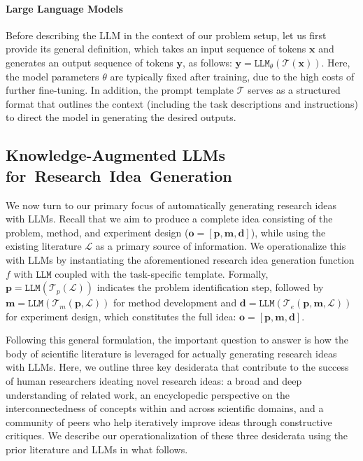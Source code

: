 \documentclass[11pt]{article}
\def\vd{{\bm{d}}}
\def\vm{{\bm{m}}}
\def\vo{{\bm{o}}}
\def\vp{{\bm{p}}}
\def\vx{{\bm{x}}}
\def\vy{{\bm{y}}}
\begin{document}
\paragraph{Large Language Models}
Before describing the LLM in the context of our problem setup, let us first provide its general definition, which takes an input sequence of tokens $\vx$ and generates an output sequence of tokens $\vy$, as follows: $\vy = \texttt{LLM}_{\theta}(\mathcal{T}(\vx))$. Here, the model parameters $\theta$ are typically fixed after training, due to the high costs of further fine-tuning. In addition, the prompt template $\mathcal{T}$ serves as a structured format that outlines the context (including the task descriptions and instructions) to direct the model in generating the desired outputs.


\subsection{Knowledge-Augmented LLMs for~Research~Idea~Generation}
We now turn to our primary focus of automatically generating research ideas with LLMs. Recall that we aim to produce a complete idea consisting of the problem, method, and experiment design ($\vo = [\vp, \vm, \vd]$), while using the existing literature $\mathcal{L}$ as a primary source of information. We operationalize this with LLMs by instantiating the aforementioned research idea generation function $f$ with $\texttt{LLM}$ coupled with the task-specific template. Formally, $\vp = \texttt{LLM}(\mathcal{T}_p(\mathcal{L}))$ indicates the problem identification step, followed by $\vm = \texttt{LLM}(\mathcal{T}_m(\vp, \mathcal{L}))$ for method development and $\vd = \texttt{LLM}(\mathcal{T}_e(\vp, \vm, \mathcal{L}))$ for experiment design, which constitutes the full idea: $\vo = [\vp, \vm, \vd]$. 

Following this general formulation, the important question to answer is how the body of scientific literature is leveraged for actually generating research ideas with LLMs. 
Here, we outline three key desiderata that contribute to the success of human researchers ideating novel research ideas: a broad and deep understanding of related work, an encyclopedic perspective on the interconnectedness of concepts within and across scientific domains, and a community of peers who help iteratively improve ideas through constructive critiques. We describe our operationalization of these three desiderata using the prior literature and LLMs in what follows.
\end{document}
